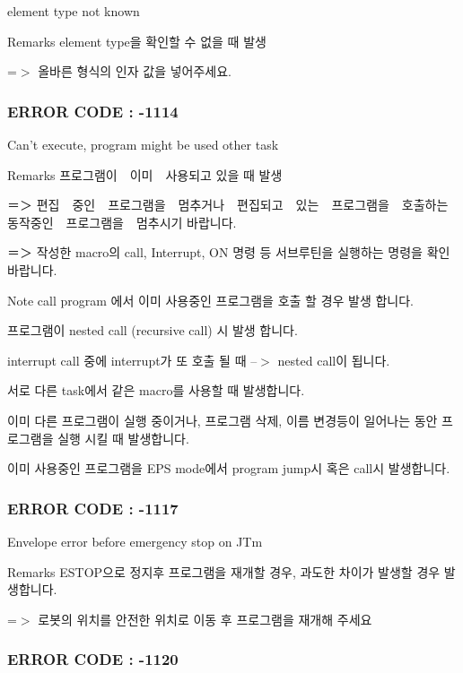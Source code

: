 element type not known \begin{DoxyRemark}{Remarks}
element type을 확인할 수 없을 때 발생 \par
 =$>$ 올바른 형식의 인자 값을 넣어주세요.
\end{DoxyRemark}


 \subsubsection*{E\-R\-R\-O\-R C\-O\-D\-E \-: -\/1114 }

Can't execute, program might be used other task \begin{DoxyRemark}{Remarks}
프로그램이　이미　사용되고 있을 때 발생 \par
 ＝＞ 편집　중인　프로그램을　멈추거나　편집되고　있는　프로그램을　호출하는　동작중인　프로그램을　멈추시기 바랍니다.\par
 ＝＞ 작성한 macro의 call, Interrupt, O\-N 명령 등 서브루틴을 실행하는 명령을 확인 바랍니다. 
\end{DoxyRemark}
\begin{DoxyNote}{Note}
call program 에서 이미 사용중인 프로그램을 호출 할 경우 발생 합니다. 

프로그램이 nested call (recursive call) 시 발생 합니다. 

interrupt call 중에 interrupt가 또 호출 될 때 --$>$ nested call이 됩니다. 

서로 다른 task에서 같은 macro를 사용할 때 발생합니다. 

이미 다른 프로그램이 실행 중이거나, 프로그램 삭제, 이름 변경등이 일어나는 동안 프로그램을 실행 시킬 때 발생합니다. 

이미 사용중인 프로그램을 E\-P\-S mode에서 program jump시 혹은 call시 발생합니다.
\end{DoxyNote}


 \subsubsection*{E\-R\-R\-O\-R C\-O\-D\-E \-: -\/1117 }

Envelope error before emergency stop on J\-Tm \begin{DoxyRemark}{Remarks}
E\-S\-T\-O\-P으로 정지후 프로그램을 재개할 경우, 과도한 차이가 발생할 경우 발생합니다. \par
 =$>$ 로봇의 위치를 안전한 위치로 이동 후 프로그램을 재개해 주세요
\end{DoxyRemark}


 \subsubsection*{E\-R\-R\-O\-R C\-O\-D\-E \-: -\/1120 }

